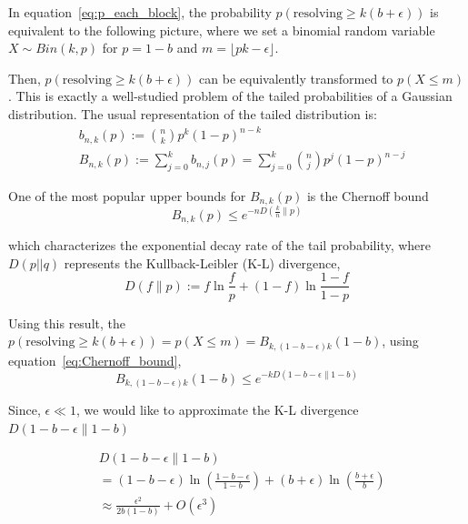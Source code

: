 \documentclass[%
 reprint,
superscriptaddress,
 amsmath,amssymb,
 aps,
]{revtex4-2}
\begin{document}
In equation~\ref{eq:p_each_block}, the probability $p(\text{resolving}\ge k(b+\epsilon))$ is equivalent to the following picture, where we set a binomial random variable $X \sim Bin(k, p)$ for $p=1-b$ and $m = \lfloor pk-\epsilon\rfloor$. 

Then, $p(\text{resolving}\ge k(b+\epsilon))$ can be equivalently transformed to $p(X\le m)$. This is exactly a well-studied problem of the tailed probabilities of a Gaussian distribution. The usual representation of the tailed distribution is:
\begin{equation}
\begin{aligned}
&b_{n, k}(p):=\binom{n}{k} p^k (1-p)^{n-k}\\
&B_{n, k}(p):=\sum_{j=0}^k b_{n, j}(p)=\sum_{j=0}^k\binom{n}{j} p^j (1-p)^{n-j}
\end{aligned}
\end{equation}

One of the most popular upper bounds for $B_{n,k}(p)$ is the Chernoff bound
\begin{equation}
    B_{n,k}(p)\le e^{-nD\left(\frac{k}{n}\|p\right)}
    \label{eq:Chernoff_bound}
\end{equation}

which characterizes the exponential decay rate of the tail probability, where $D(p||q)$ represents the Kullback-Leibler (K-L) divergence, 
\begin{equation}
D(f \| p):=f \ln \frac{f}{p}+(1-f) \ln \frac{1-f}{1-p}
\end{equation}

Using this result, the $p(\text{resolving}\ge k(b+\epsilon)) = p(X\le m) = B_{k, (1-b-\epsilon)k}(1-b)$, using equation~\ref{eq:Chernoff_bound},
\begin{equation}
    B_{k, (1-b-\epsilon)k}(1-b)\le e^{-kD\left(1-b-\epsilon\|1-b\right)}
\end{equation}

Since, $\epsilon\ll1$, we would like to approximate the K-L divergence $D(1-b-\epsilon\|1-b)$

\begin{equation}
\begin{split}
    &D(1-b-\epsilon\|1-b)\\&=(1-b-\epsilon)\ln\left(\frac{1-b-\epsilon}{1-b}\right)+(b+\epsilon)\ln\left(\frac{b+\epsilon}{b}\right)\\
    &\approx \frac{\epsilon^2}{2b(1-b)}+O(\epsilon^3)
    \end{split}
\end{equation}
\end{document}
